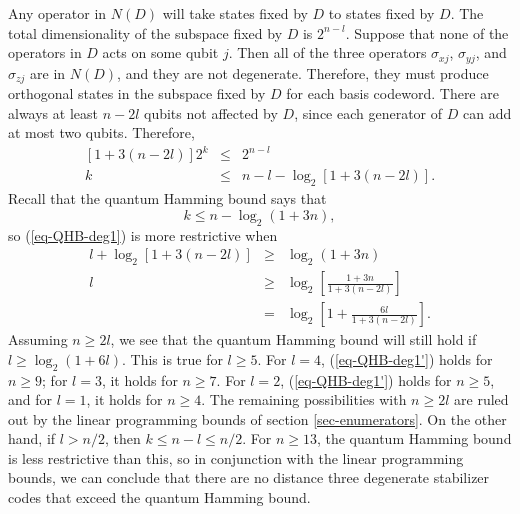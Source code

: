 \documentclass{report}
\newcommand{\Xs}[1]{\sigma_{x{#1}}}
\newcommand{\Ys}[1]{\sigma_{y{#1}}}
\newcommand{\Zs}[1]{\sigma_{z{#1}}}
\begin{document}
Any operator in $N(D)$ will take states fixed by $D$ to states fixed by $D$.  
The total dimensionality of the subspace fixed by $D$ is $2^{n-l}$.  Suppose 
that none of the operators in $D$ acts on some qubit $j$.  Then all of the 
three operators $\Xs{j}$, $\Ys{j}$, and $\Zs{j}$ are in $N(D)$, and they are
not degenerate.  Therefore, they must produce orthogonal states in the 
subspace fixed by $D$ for each basis codeword.  There are always at least 
$n-2l$ qubits not affected by $D$, since each generator of $D$ can add at 
most two qubits.  Therefore,
\begin{eqnarray}
\left[1 + 3(n-2l) \right] 2^k & \leq & 2^{n-l} \\
k & \leq & n - l - \log_2 [1+3(n-2l)]. \label{eq-QHB-deg1}
\end{eqnarray}
Recall that the quantum Hamming bound says that
\begin{equation}
k \leq n - \log_2 (1+3n),
\end{equation}
so (\ref{eq-QHB-deg1}) is more restrictive when
\begin{eqnarray}
l + \log_2 [1+3(n-2l)] & \geq & \log_2 (1+3n) \\
l & \geq & \log_2 \left[ \frac{1+3n}{1+3(n-2l)} \right] \\
& = & \log_2 \left[ 1 + \frac{6l}{1 + 3(n-2l)} \right]. \label{eq-QHB-deg1'}
\end{eqnarray}
Assuming $n \geq 2l$, we see that the quantum Hamming bound will still 
hold if $l \geq \log_2 (1+6l)$.  This is true for $l \geq 5$.  For $l=4$, 
(\ref{eq-QHB-deg1'}) holds for $n \geq 9$; for $l=3$, it holds for $n \geq 
7$.  For $l=2$, (\ref{eq-QHB-deg1'}) holds for $n \geq 5$, and for $l=1$, it 
holds for $n \geq 4$.  The remaining possibilities with $n \geq 2l$ are 
ruled out by the linear programming bounds of section
\ref{sec-enumerators}.  On the other hand, if $l > n/2$, then $k \leq n-l 
\leq n/2$.  For $n \geq 13$, the quantum Hamming bound is less 
restrictive than this, so in conjunction with the linear programming 
bounds, we can conclude that there are no distance three degenerate stabilizer 
codes that exceed the quantum Hamming bound.
\end{document}
